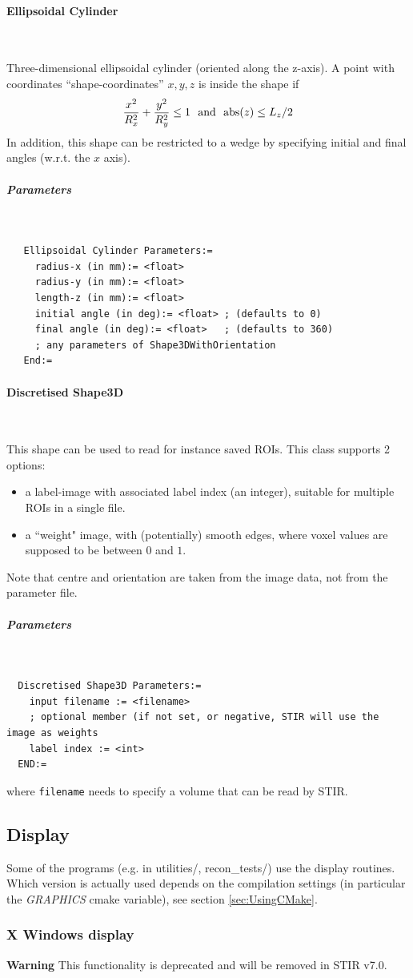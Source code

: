 \documentclass{article}
\newcommand{\subsubsubsection}[1]{\paragraph{#1}\mbox{} \\}
\newcommand{\subsubsubsubsection}[1]{\subparagraph{#1} \mbox{} \\}
\begin{document}
{{{{{{{ \subsubsubsection{Ellipsoidal Cylinder}
}
Three-dimensional ellipsoidal cylinder (oriented along the z-axis).
A point with coordinates ``shape-coordinates'' $x,y,z$ is inside the shape if
\[
  {x^2 \over R_x^2} + {y^2 \over R_y^2}  \le 1 \,\,\,\, \mathrm{and}  \,\,\,\,\mathrm{abs}(z) \le L_z/2
\]
In addition, this shape can be restricted to a wedge by specifying initial and final angles (w.r.t. the $x$ axis).
\subsubsubsubsection{Parameters}
\begin{verbatim}
   Ellipsoidal Cylinder Parameters:=
     radius-x (in mm):= <float>
     radius-y (in mm):= <float>
     length-z (in mm):= <float>
     initial angle (in deg):= <float> ; (defaults to 0)
     final angle (in deg):= <float>   ; (defaults to 360)
     ; any parameters of Shape3DWithOrientation
   End:=
\end{verbatim}

{ \subsubsubsection{Discretised Shape3D}
}
This shape can be used to read for instance saved ROIs. This class supports 2 options:
\begin{itemize}
  \item a label-image with associated label index (an integer), suitable for multiple ROIs in a single file.
  \item a ``weight" image, with (potentially) smooth edges, where voxel values
    are supposed to be between $0$ and $1$.
\end{itemize}
Note that centre and orientation are taken from the image data, not from the parameter file.
{ \subsubsubsubsection{Parameters}
}
\begin{verbatim}
  Discretised Shape3D Parameters:=
    input filename := <filename>
    ; optional member (if not set, or negative, STIR will use the image as weights
    label index := <int>
  END:=
\end{verbatim}
where \texttt{filename} needs to specify a volume that can be read by STIR.


\subsection{
Display}\label{sec:display}
Some of the programs (e.g. in utilities/, recon\_tests/) use 
the display routines. Which version is actually used depends 
on the compilation settings (in particular the \textit{GRAPHICS} cmake 
variable), see section \ref{sec:UsingCMake}. 


\subsubsection{
X Windows display}
\label{sec:displayX}
\textbf{Warning} This functionality is deprecated and will be removed in STIR v7.0.

}}}}}}
\end{document}
